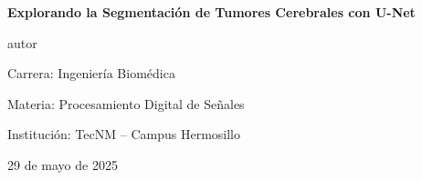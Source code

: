 \documentclass[12pt,oneside]{report}
\newcommand{\ProyectoTitulo}{\textbf{Explorando la Segmentación de Tumores Cerebrales con U-Net}}
\newcommand{\Integrantes}{autor}
\newcommand{\Carrera}{Ingeniería Biomédica}
\newcommand{\Materia}{Procesamiento Digital de Señales}
\newcommand{\Institucion}{TecNM – Campus Hermosillo}
\newcommand{\Fecha}{29 de mayo de 2025}
\begin{document}
\begin{titlepage}
    \centering
    \vspace*{3cm}
    {\Huge \ProyectoTitulo\par}
    \vspace{2cm}
    {\Large \Integrantes\par}
    \vspace{1cm}
    {\large Carrera: \Carrera\par}
    {\large Materia: \Materia\par}
    {\large Institución: \Institucion\par}
    \vfill
    {\large \Fecha\par}
\end{titlepage}

\begin{abstract}
\noindent\textbf{Resumen}\\
Se presenta una experiencia práctica empleando la arquitectura U-Net para la
segmentación de tumores cerebrales, contrastando un tutorial básico,
un ejemplo oficial de MATLAB 3-D U-Net y el artículo de referencia de
Isensee \textit{et al.} (2018).\\[6pt]
\textbf{Palabras clave:} segmentación, U-Net, MRI, Dice, Deep Learning.

\vspace{1em}
\noindent\textbf{Abstract}\\
This report summarises hands-on work with a basic U-Net tutorial,
MATLAB’s 3-D U-Net example and the BRATS 2017 contribution by
Isensee \textit{et al.} (2018).\\[6pt]
\textbf{Keywords:} segmentation, U-Net, MRI, Dice, Deep Learning.
\end{abstract}

\tableofcontents
\clearpage





{}

\end{document}
